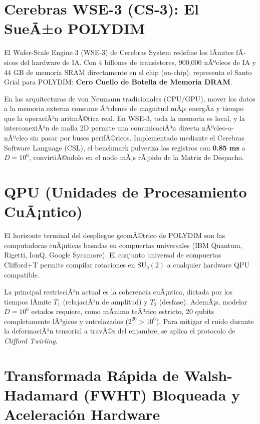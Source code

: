 \section{Cerebras WSE-3 (CS-3): El SueÃ±o POLYDIM}
\label{sec:cerebras_wse}

El Wafer-Scale Engine 3 (WSE-3) de Cerebras System redefine los lÃ­mites fÃ­sicos del hardware de IA. Con 4 billones de transistores, 900,000 nÃºcleos de IA y 44 GB de memoria SRAM directamente en el chip (on-chip), representa el Santo Grial para POLYDIM: \textbf{Cero Cuello de Botella de Memoria DRAM}.

En las arquitecturas de von Neumann tradicionales (CPU/GPU), mover los datos a la memoria externa consume Ã³rdenes de magnitud mÃ¡s energÃ­a y tiempo que la operaciÃ³n aritmÃ©tica real. En WSE-3, toda la memoria es local, y la interconexiÃ³n de malla 2D permite una comunicaciÃ³n directa nÃºcleo-a-nÃºcleo sin pasar por buses perifÃ©ricos. 
Implementado mediante el Cerebras Software Language (CSL), el benchmark pulveriza los registros con \textbf{0.85 ms} a \(D=10^6\), convirtiÃ©ndolo en el nodo mÃ¡s rÃ¡pido de la Matriz de Despacho.

\section{QPU (Unidades de Procesamiento CuÃ¡ntico)}
\label{sec:quantum_qpu}

El horizonte terminal del despliegue geomÃ©trico de POLYDIM son las computadoras cuÃ¡nticas basadas en compuertas universales (IBM Quantum, Rigetti, IonQ, Google Sycamore). El conjunto universal de compuertas Clifford+T permite compilar rotaciones en \(\text{SU}_q(2)\) a cualquier hardware QPU compatible.

La principal restricciÃ³n actual es la coherencia cuÃ¡ntica, dictada por los tiempos lÃ­mite \(T_1\) (relajaciÃ³n de amplitud) y \(T_2\) (desfase). AdemÃ¡s, modelar \(D=10^6\) estados requiere, como mÃ­nimo teÃ³rico estricto, 20 qubits completamente lÃ³gicos y entrelazados (\(2^{20} > 10^6\)). Para mitigar el ruido durante la deformaciÃ³n tensorial a travÃ©s del enjambre, se aplica el protocolo de \textit{Clifford Twirling}.

\section{Transformada Rápida de Walsh-Hadamard (FWHT) Bloqueada y Aceleración Hardware}
\label{sec:fwht_bloqueada}

